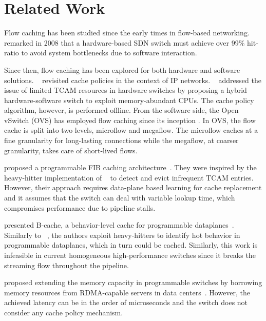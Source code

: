 \section{Related Work}\label{sec:related_works}

Flow caching has been studied since the early times in flow-based networking.
\citeauthor{casado:2008}~\cite{casado:2008} remarked in 2008 that a hardware-based SDN switch must achieve over 99\% hit-ratio to avoid system bottlenecks due to software interaction.

Since then, flow caching has been explored for both hardware and software solutions.
\citeauthor{Kim:09}~\cite{Kim:09} revisited cache policies in the context of IP networks.
\citeauthor{Katta:2014}~\cite{Katta:2014,Katta:2016} addressed the issue of limited TCAM resources in hardware switches by proposing a hybrid hardware-software switch to exploit memory-abundant CPUs.
The cache policy algorithm, however, is performed offline. 
From the software side, the Open vSwitch (OVS) has employed flow caching since its inception \cite{Pfaff:2015}.
In OVS, the flow cache is split into two levels, microflow and megaflow.
The microflow caches at a fine granularity for long-lasting connections while the megaflow, at coarser granularity, takes care of short-lived flows.

\citeauthor{Grigoryan:18} proposed a programmable FIB caching architecture~\cite{Grigoryan:18}.
They were inspired by the heavy-hitter implementation of \citeauthor{Sivaraman:17}~\cite{Sivaraman:17} to detect and evict infrequent TCAM entries.
However, their approach requires data-plane based learning for cache replacement and it assumes that the switch can deal with variable lookup time, which compromises performance due to pipeline stalls. 

\citeauthor{Zhang:2018} presented B-cache, a behavior-level cache for programmable dataplanes~\cite{Zhang:2018}. Similarly to \citeauthor{Grigoryan:18}~\cite{Grigoryan:18}, the authors exploit heavy-hitters to identify hot behavior in programmable dataplanes, which in turn could be cached. Similarly, this work is infeasible in current homogeneous high-performance switches since it breaks the streaming flow throughout the pipeline.

\citeauthor{Kim:2018} proposed extending the memory capacity in programmable switches by borrowing memory resources from RDMA-capable servers in data centers~\cite{Kim:2018}. However, the achieved latency can be in the order of microseconds and the switch does not consider any cache policy mechanism.

